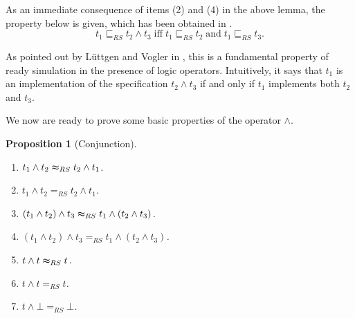 \documentclass{elsarticle}
\theoremstyle{plain}
\newtheorem{proposition}[theorem]{Proposition}
\theoremstyle{definition}
\begin{document}
As an immediate consequence of items (2) and (4) in the above lemma, the property below is given, which has been obtained in \cite{Luttgen10}.
\[t_1 \sqsubseteq_{RS} t_2 \wedge t_3 \;\text{iff}\;t_1 \sqsubseteq_{RS} t_2\;\text{and}\; t_1 \sqsubseteq_{RS} t_3 .\]

As pointed out by L\"{u}ttgen and Vogler in \cite{Luttgen07,Luttgen10}, this is a fundamental property of ready simulation in the presence of logic operators. Intuitively, it says that $t_1$ is an implementation  of the specification $t_2\wedge t_3$ if and only if $t_1$ implements both $t_2$ and $t_3$.

We now are ready to prove some basic properties of the operator $\wedge$.

\begin{proposition}[Conjunction]\label{S:CONJUNCTION}\hfill
    \begin{enumerate}
      \item $t_1  \wedge t_2 \thickapprox_{RS} t_2 \wedge t_1$.
      \item $t_1  \wedge t_2 =_{RS} t_2 \wedge t_1$.
      \item $(t_1 \wedge t_2) \wedge t_3 \thickapprox_{RS} t_1 \wedge (t_2 \wedge t_3)$.
      \item $(t_1 \wedge t_2) \wedge t_3 =_{RS} t_1 \wedge (t_2 \wedge t_3)$.
      \item $t \wedge t\thickapprox_{RS} t$.
      \item $t \wedge t =_{RS} t$.
      \item $t \wedge \bot =_{RS} \bot$.
    \end{enumerate}
\end{proposition}
\end{document}
